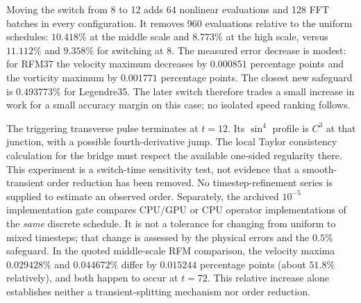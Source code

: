 Moving the switch from 8 to 12 adds 64 nonlinear evaluations and 128 FFT batches in every configuration. It removes 960 evaluations relative to the uniform schedules: $10.418\%$ at the middle scale and $8.773\%$ at the high scale, versus $11.112\%$ and $9.358\%$ for switching at 8. The measured error decrease is modest: for RFM37 the velocity maximum decreases by $0.000851$ percentage points and the vorticity maximum by $0.001771$ percentage points. The closest new safeguard is $0.493773\%$ for Legendre35. The later switch therefore trades a small increase in work for a small accuracy margin on this case; no isolated speed ranking follows.

The triggering transverse pulse terminates at $t=12$. Its $\sin^4$ profile is $C^3$ at that junction, with a possible fourth-derivative jump. The local Taylor consistency calculation for the bridge must respect the available one-sided regularity there. This experiment is a switch-time sensitivity test, not evidence that a smooth-transient order reduction has been removed. No timestep-refinement series is supplied to estimate an observed order. Separately, the archived $10^{-5}$ implementation gate compares CPU/GPU or CPU operator implementations of the \emph{same} discrete schedule. It is not a tolerance for changing from uniform to mixed timesteps; that change is assessed by the physical errors and the $0.5\%$ safeguard. In the quoted middle-scale RFM comparison, the velocity maxima $0.029428\%$ and $0.044672\%$ differ by $0.015244$ percentage points (about $51.8\%$ relatively), and both happen to occur at $t=72$. This relative increase alone establishes neither a transient-splitting mechanism nor order reduction.


